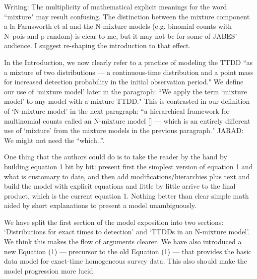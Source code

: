 \documentclass[12pt]{article}
\renewenvironment{quote}  %
              {\list{}{\rightmargin\leftmargin}\normalfont%
               \item\relax}
              {\endlist}
\newcommand{\jarad}[1]{{\color{Orange} JARAD: #1}}
\begin{document}
Writing: The multiplicity of mathematical explicit meanings for the word ``mixture" may result confusing. The distinction between the mixture component a la Farnsworth et al and the N-mixture models (e.g. binomial counts with N~pois and p random) is clear to me, but it may not be for some of JABES' audience.  I suggest re-shaping the introduction to that effect. 
\begin{quote}
In the Introduction, we now clearly refer to a practice of modeling the TTDD ``as a mixture of two distributions --- a continuous-time distribution and a point mass for increased detection probability in the initial observation period."
We define our use of `mixture model' later in the paragraph:  ``We apply the term `mixture model' to any model with a mixture TTDD."
This is contrasted in our definition of `N-mixture model' in the next paragraph: ``a hierarchical framework for multinomial counts called an N-mixture model [\dotso] --- which is an entirely different use of `mixture' from the mixture models in the previous paragraph."
\jarad{We might not need the ``which..''.}
\end{quote}

One thing that the authors could do is to take the reader by the hand by building equation 1 bit by bit: present first the simplest version of equation 1 and what is customary to date, and then add modifications/hierarchies plus text and build the model with explicit equations and little by little arrive to the final product, which is the current equation 1. Nothing better than clear simple math aided by short explanations to present a model unambiguously.
\begin{quote}
We have split the first section of the model exposition into two sections: `Distributions for exact times to detection' and `TTDDs in an N-mixture model'.
We think this makes the flow of arguments clearer.
We have also introduced a new Equation (1) --- precursor to the old Equation (1) --- that provides the basic data model for exact-time homogeneous survey data.
This also should make the model progression more lucid.
\end{quote}
\end{document}
